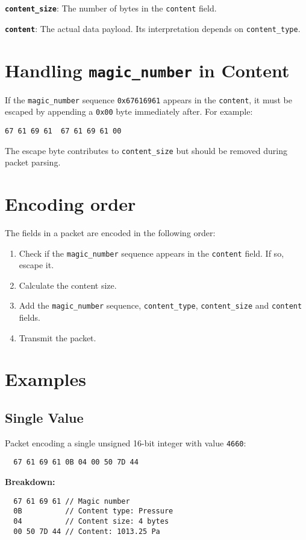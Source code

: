 \documentclass[a4paper]{article}
\begin{document}
\textbf{\texttt{content\_size}}: The number of bytes in the \texttt{content} field.

\textbf{\texttt{content}}: The actual data payload. Its interpretation depends on \texttt{content\_type}.

\section{Handling \texttt{magic\_number} in Content}
If the \texttt{magic\_number} sequence \texttt{0x67616961} appears in the \texttt{content}, it must be escaped by appending a \texttt{0x00} byte immediately after. For example:

\texttt{67 61 69 61 }\textrightarrow\texttt{ 67 61 69 61 00}

The escape byte contributes to \texttt{content\_size} but should be removed during packet parsing.

\section{Encoding order}
The fields in a packet are encoded in the following order:
\begin{enumerate}
  \item Check if the \texttt{magic\_number} sequence appears in the \texttt{content} field. If so, escape it.
  \item Calculate the content size.
  \item Add the \texttt{magic\_number} sequence, \texttt{content\_type}, \texttt{content\_size} and \texttt{content} fields.
  \item Transmit the packet.
\end{enumerate}

\section{Examples}
\subsection{Single Value}
Packet encoding a single unsigned 16-bit integer with value \texttt{4660}:
\begin{verbatim}
  67 61 69 61 0B 04 00 50 7D 44
\end{verbatim}
\textbf{Breakdown:}
\begin{verbatim}
  67 61 69 61 // Magic number
  0B          // Content type: Pressure
  04          // Content size: 4 bytes
  00 50 7D 44 // Content: 1013.25 Pa
\end{verbatim}
\end{document}
